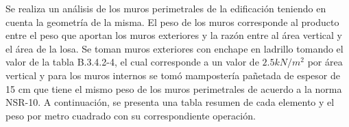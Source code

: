 \documentclass[12pt]{article}
\begin{document}
Se realiza un análisis de los muros perimetrales de la edificación teniendo en cuenta la geometría de la misma. El peso de los muros corresponde al producto entre el peso que aportan los muros exteriores y la razón entre al área vertical y el área de la losa. Se toman muros exteriores con enchape en ladrillo tomando el valor de la tabla B.3.4.2-4, el cual corresponde a un valor de $2.5 kN/m^2$ por área vertical y para los muros internos se tomó mampostería pañetada de espesor de 15 cm que tiene el mismo peso de los muros perimetrales de acuerdo a la norma NSR-10. A continuación, se presenta una tabla resumen de cada elemento y el peso por metro cuadrado con su correspondiente operación.

\begin{table}[H]
  \centering
 

\end{table}
\end{document}
